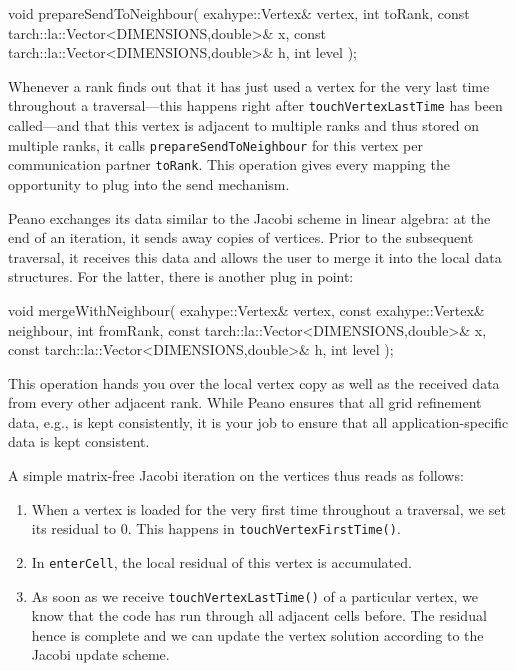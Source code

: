 \begin{code}
void prepareSendToNeighbour(
  exahype::Vertex&                             vertex,
  int                                          toRank,
  const tarch::la::Vector<DIMENSIONS,double>&  x,
  const tarch::la::Vector<DIMENSIONS,double>&  h,
  int                                          level
);
\end{code}

\noindent
Whenever a rank finds out that it has just used a vertex for the very last time
throughout a traversal---this happens right after \texttt{touchVertexLastTime}
has been called---and that this vertex is adjacent to multiple ranks and thus
stored on multiple ranks, it calls \texttt{prepareSendToNeighbour} for this
vertex per communication partner \texttt{toRank}.
This operation gives every mapping the opportunity to plug into the send
mechanism.

Peano exchanges its data similar to the Jacobi scheme in linear algebra: 
at the end of an iteration, it sends away copies of vertices. 
Prior to the subsequent traversal, it receives this data and allows the user to
merge it into the local data structures.
For the latter, there is another plug in point:
\begin{code}
void mergeWithNeighbour(
  exahype::Vertex&                              vertex,
  const exahype::Vertex&                        neighbour,
  int                                           fromRank,
  const tarch::la::Vector<DIMENSIONS,double>&   x,
  const tarch::la::Vector<DIMENSIONS,double>&   h,
  int                                           level
);
\end{code}

\noindent
This operation hands you over the local vertex copy as well as the received data
from every other adjacent rank.
While Peano ensures that all grid refinement data, e.g., is kept consistently,
it is your job to ensure that all application-specific data is kept consistent.

A simple matrix-free Jacobi iteration on the vertices thus reads as follows:
\begin{enumerate}
  \item When a vertex is loaded for the very first time throughout a traversal,
  we set its residual to $0$. This happens in \texttt{touchVertexFirstTime()}.
  \item In \texttt{enterCell}, the local residual of this vertex is accumulated.
  \item As soon as we receive \texttt{touchVertexLastTime()} of a particular
  vertex, we know that the code has run through all adjacent cells before. The
  residual hence is complete and we can update the vertex solution according to
  the Jacobi update scheme.
\end{enumerate}

